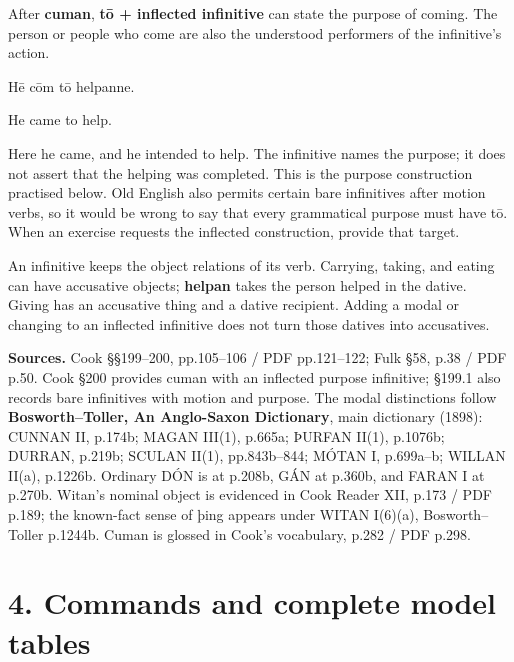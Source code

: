 After \textbf{cuman}, \textbf{tō + inflected infinitive} can state the purpose of coming. The person or people who come are also the understood performers of the infinitive’s action.

Hē cōm tō helpanne.

He came to help.

Here he came, and he intended to help. The infinitive names the purpose; it does not assert that the helping was completed. This is the purpose construction practised below. Old English also permits certain bare infinitives after motion verbs, so it would be wrong to say that every grammatical purpose must have tō. When an exercise requests the inflected construction, provide that target.

An infinitive keeps the object relations of its verb. Carrying, taking, and eating can have accusative objects; \textbf{helpan} takes the person helped in the dative. Giving has an accusative thing and a dative recipient. Adding a modal or changing to an inflected infinitive does not turn those datives into accusatives.

\textbf{Sources.} Cook §§199–200, pp.105–106 /\allowbreak{} PDF pp.121–122; Fulk §58, p.38 /\allowbreak{} PDF p.50. Cook §200 provides cuman with an inflected purpose infinitive; §199.1 also records bare infinitives with motion and purpose. The modal distinctions follow \textbf{Bosworth–Toller, An Anglo-Saxon Dictionary}, main dictionary (1898): CUNNAN II, p.174b; MAGAN III(1), p.665a; ÞURFAN II(1), p.1076b; DURRAN, p.219b; SCULAN II(1), pp.843b–844; MÓTAN I, p.699a–b; WILLAN II(a), p.1226b. Ordinary DÓN is at p.208b, GÁN at p.360b, and FARAN I at p.270b. Witan’s nominal object is evidenced in Cook Reader XII, p.173 /\allowbreak{} PDF p.189; the known-fact sense of þing appears under WITAN I(6)(a), Bosworth–Toller p.1244b. Cuman is glossed in Cook’s vocabulary, p.282 /\allowbreak{} PDF p.298.

\section*{4. Commands and complete model tables}

